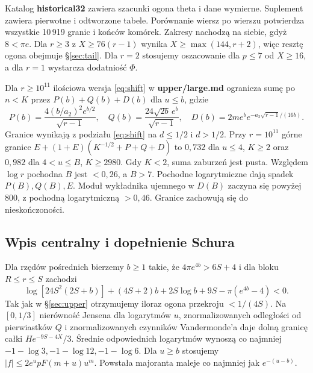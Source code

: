\documentclass[11pt,a4paper,reqno]{amsart}
\numberwithin{equation}{section}
\begin{document}
Katalog \textbf{historical32} zawiera szacunki ogona theta i dane wymierne. Suplement zawiera pierwotne i odtworzone tabele. Porównanie wiersz po wierszu potwierdza wszystkie 10\,919 granic i końców komórek. Zakresy nachodzą na siebie, gdyż \(8<\pi e\). Dla \(r\ge3\) z \(X\ge76(r-1)\) wynika \(X\ge\max(144,r+2)\), więc resztę ogona obejmuje \S\ref{sec:tail}. Dla \(r=2\) stosujemy oszacowanie dla \(p\le7\) od \(X\ge16\), a dla \(r=1\) wystarcza dodatniość \(\Phi\).

Dla \(r\ge10^{11}\) ilościowa wersja \eqref{eq:shift} w \textbf{upper/large.md} ogranicza sumę po \(n<K\) przez \(P(b)+Q(b)+D(b)\) dla \(u\le b\), gdzie \[P(b)=\frac{4(b/a_2)^2e^{b/2}}{\sqrt{r-1}},\quad Q(b)=\frac{24\sqrt{2b}\,e^b}{\sqrt{r-1}},\quad
D(b)=2m e^b e^{-a_2\sqrt{r-1}/(16b)}.\] Granice wynikają z podziału \eqref{eq:shift} na \(d\le1/2\) i \(d>1/2\). Przy \(r=10^{11}\) górne granice \(E+(1+E)(K^{-1/2}+P+Q+D)\) to \(0{,}732\) dla \(u\le4\), \(K\ge2\) oraz \(0{,}982\) dla \(4<u\le B\), \(K\ge2980\). Gdy \(K<2\), suma zaburzeń jest pusta. Względem \(\log r\) pochodna \(B\) jest \(<0{,}26\), a \(B>7\). Pochodne logarytmiczne dają spadek \(P(B),Q(B),E\). Moduł wykładnika ujemnego w \(D(B)\) zaczyna się powyżej 800, z pochodną logarytmiczną \(>0{,}46\). Granice zachowują się do nieskończoności.

\subsection{Wpis centralny i dopełnienie Schura}\label{sec:schur}


Dla rzędów pośrednich bierzemy \(b\ge1\) takie, że \(4\pi e^{4b}>6S+4\) i dla bloku \(R\le r\le S\) zachodzi \[\log[24S^2(2S+b)]+(4S+2)b+2S\log b+9S-\pi(e^{4b}-4)<0.\] Tak jak w \S\ref{sec:upper} otrzymujemy iloraz ogona przekroju \(<1/(4S)\). Na \([0,1/3]\) nierówność Jensena dla logarytmów \(u\), znormalizowanych odległości od pierwiastków \(Q\) i znormalizowanych czynników Vandermonde'a daje dolną granicę całki \(He^{-9S-4X}/3\). Średnie odpowiednich logarytmów wynoszą co najmniej \(-1-\log3,-1-\log12,-1-\log6\). Dla \(u\ge b\) stosujemy \(|f|\le2e^upF(m+u)u^m\). Powstała majoranta maleje co najmniej jak \(e^{-(u-b)}\).
\end{document}
